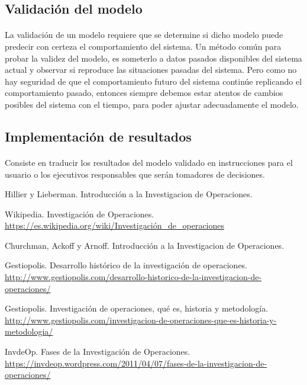 \documentclass[12pt, a4paper,spanish]{article}
\begin{document}
		\subsection{Validación del modelo}

			\paragraph{}
			La validación de un modelo requiere que se determine si dicho modelo puede predecir con certeza el comportamiento del sistema. Un método común para probar la validez del modelo, es someterlo a datos pasados disponibles del sistema actual y observar si reproduce las situaciones pasadas del sistema. Pero como no hay seguridad de que el comportamiento futuro del sistema continúe replicando el comportamiento pasado, entonces siempre debemos estar atentos de cambios posibles del sistema con el tiempo, para poder ajustar adecuadamente el modelo.\cite{invdeop_IO}

		\subsection{Implementación de resultados}

			\paragraph{}
			Consiste en traducir los resultados del modelo validado en instrucciones para el usuario o los ejecutivos responsables que serán tomadores de decisiones.\cite{invdeop_IO}


	\begin{thebibliography}{9}


		Hillier y Lieberman. Introducción a la Investigacion de Operaciones.

		Wikipedia. Investigación de Operaciones. \\
		\url{https://es.wikipedia.org/wiki/Investigación_de_operaciones}

		Churchman, Ackoff y Arnoff. Introducción a la Investigacion de Operaciones.

		Gestiopolis. Desarrollo histórico de la investigación de operaciones. \\
		\url{http://www.gestiopolis.com/desarrollo-historico-de-la-investigacion-de-operaciones/}

		Gestiopolis. Investigación de operaciones, qué es, historia y metodología. \\
		\url{http://www.gestiopolis.com/investigacion-de-operaciones-que-es-historia-y-metodologia/}

		InvdeOp. Fases de la Investigación de Operaciones. \\
		\url{https://invdeop.wordpress.com/2011/04/07/fases-de-la-investigacion-de-operaciones/}

	\end{thebibliography}
\end{document}
